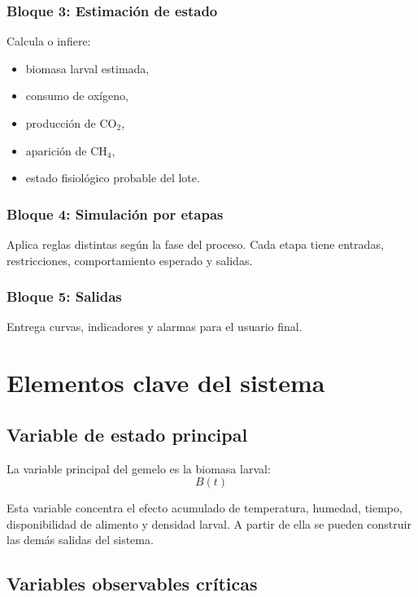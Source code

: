 \documentclass[12pt,a4paper]{report}
\begin{document}
\subsection{Bloque 3: Estimación de estado}
Calcula o infiere:
\begin{itemize}[leftmargin=0.7cm]
    \item biomasa larval estimada,
    \item consumo de oxígeno,
    \item producción de CO$_2$,
    \item aparición de CH$_4$,
    \item estado fisiológico probable del lote.
\end{itemize}

\subsection{Bloque 4: Simulación por etapas}
Aplica reglas distintas según la fase del proceso. Cada etapa tiene entradas, restricciones, comportamiento esperado y salidas.

\subsection{Bloque 5: Salidas}
Entrega curvas, indicadores y alarmas para el usuario final.

\chapter{Elementos clave del sistema}

\section{Variable de estado principal}

La variable principal del gemelo es la biomasa larval:
\begin{equation}
    B(t)
\end{equation}

Esta variable concentra el efecto acumulado de temperatura, humedad, tiempo, disponibilidad de alimento y densidad larval. A partir de ella se pueden construir las demás salidas del sistema.

\section{Variables observables críticas}
\end{document}
